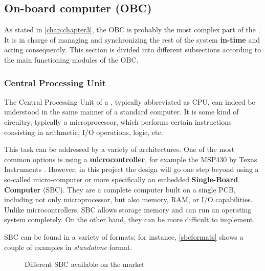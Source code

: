 \subsection{On-board computer (OBC)} \label{obcdesig}

As stated in \autoref{chap:chapter3}, the \acrshort{OBC} is probably the most complex part of the . It is in charge of managing and synchronizing the rest of the system \textbf{in-time} and acting consequently. This section is divided into different subsections according to the main functioning modules of the \acrshort{OBC}. 

\subsubsection{Central Processing Unit}

The Central Processing Unit of a , typically abbreviated as \acrshort{CPU}, can indeed be understood in the same manner of a standard computer. It is some kind of circuitry, typically a microprocessor, which performs certain instructions consisting in arithmetic, I/O operations, logic, etc.

This task can be addressed by a variety of architectures. One of the most common options is using a \textbf{microcontroller}, for example the MSP430 by Texas Instruments \cite{msp}. However, in this project the design will go one step beyond using a so-called \linebreak micro-computer or more specifically an embedded \textbf{Single-Board Computer} (\acrshort{SBC}). They are a complete computer built on a single \acrshort{PCB}, including not only microprocessor, but also memory, RAM, or I/O capabilities. Unlike microcontrollers, \acrshort{SBC} allows storage memory and can run an operating system completely. On the other hand, they can be more difficult to implement.  

\acrshort{SBC} can be found in a variety of formats; for instance, \autoref{sbcformats} shows a couple of examples in \textit{standalone} format.

			\begin{figure}[H]
			\centering
			\quad
			\caption{Different \acrshort{SBC} available on the market} \label{sbcformats}
\end{figure}




